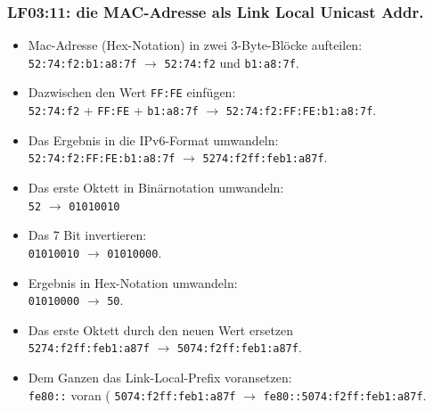 \begin{frame}
  \frametitle{LF03:11: die MAC-Adresse als Link Local Unicast Addr.}

  \begin{footnotesize}

  \begin{itemize}
    \item Mac-Adresse (Hex-Notation) in zwei 3-Byte-Blöcke aufteilen:\\
    \qquad \texttt{52:74:f2:b1:a8:7f} $\rightarrow$ \texttt{52:74:f2} und \texttt{b1:a8:7f}.
    \item Dazwischen den Wert \texttt{FF:FE} einfügen: \\
    \qquad \texttt{52:74:f2} + \texttt{FF:FE} + \texttt{b1:a8:7f} $\rightarrow$ \texttt{52:74:f2:FF:FE:b1:a8:7f}.
    \item Das Ergebnis in die IPv6-Format umwandeln: \\
    \qquad \texttt{52:74:f2:FF:FE:b1:a8:7f} $\rightarrow$ \texttt{5274:f2ff:feb1:a87f}.
    \item Das erste Oktett in Binärnotation umwandeln: \\
    \qquad \texttt{52} $\rightarrow$ \texttt{01010010}
    \item Das 7 Bit invertieren: \\
    \qquad \texttt{01010010} $\rightarrow$ \texttt{01010000}.
    \item Ergebnis in Hex-Notation umwandeln:\\ 
    \qquad \texttt{01010000} $\rightarrow$ \texttt{50}.
    \item Das erste Oktett durch den neuen Wert ersetzen \\
    \qquad \texttt{5274:f2ff:feb1:a87f} $\rightarrow$ \texttt{5074:f2ff:feb1:a87f}.
    \item Dem Ganzen das Link-Local-Prefix voransetzen: \\
    \qquad \texttt{fe80::} voran ( \texttt{5074:f2ff:feb1:a87f} $\rightarrow$ \texttt{fe80::5074:f2ff:feb1:a87f}.
  \end{itemize}


\end{footnotesize}

\end{frame}



